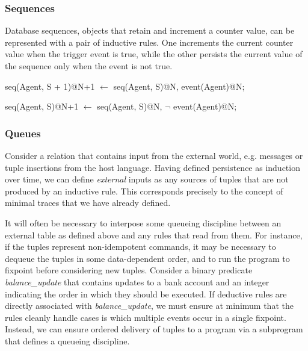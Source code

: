 \subsubsection{Sequences}

Database sequences, objects that retain and increment a counter value, can be
represented with a pair of inductive rules.  One increments the current counter value when the
trigger event is true, while the other persists the current value of the sequence only when the event is 
not true.

\begin{Dedalus}
seq(Agent, S + 1)@N+1 \(\leftarrow\)
  seq(Agent, S)@N, 
  event(Agent)@N; 
  
seq(Agent, S)@N+1 \(\leftarrow\) 
  seq(Agent, S)@N, 
  \(\lnot\) event(Agent)@N;
\end{Dedalus}

\subsubsection{Queues}


Consider a relation that contains input from the external world, e.g. messages or tuple insertions from the host language.  
Having defined persistence as induction over time, we can define \emph{external} inputs as any sources of tuples 
that are not produced by an inductive rule.  This corresponds precisely to the concept of minimal traces that we have already
defined.

It will often be necessary to interpose some queueing discipline between an external table as defined above and any
rules that read from them.  For instance, if the tuples represent non-idempotent commands, it may be necessary to dequeue
the tuples in some data-dependent order, and to run the program to fixpoint before considering new tuples.  Consider a binary
predicate \emph{balance\_update} that contains updates to a bank account and an integer indicating the order in which they
should be executed.  If deductive rules are directly associated with \emph{balance\_update}, we must ensure at minimum that
the rules cleanly handle cases is which multiple events occur in a single fixpoint.  Instead, we can ensure ordered delivery 
of tuples to a program via a subprogram that defines a queueing discipline.

